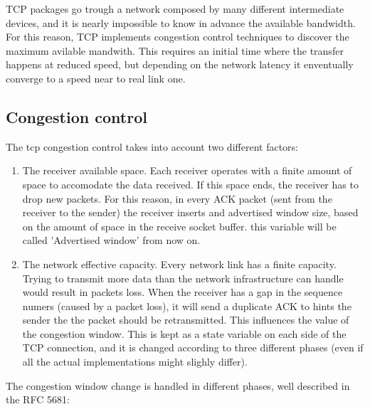 \documentclass[a4paper,10pt]{article}
\begin{document}
TCP packages go trough a network composed by many different intermediate devices, and it is nearly impossible to know in advance the available bandwidth. For this reason, TCP implements congestion control techniques to discover the maximum avilable mandwith. This requires an initial time where the transfer happens at reduced speed, but depending on the network latency it enventually converge to a speed near to real link one.

\subsection{Congestion control}
The tcp congestion control takes into account two different factors: 
\begin{enumerate}
   \item The receiver available space. Each receiver operates with a finite
      amount of space to accomodate the data received. If this space ends, the
      receiver has to drop new packets. For this reason, in every ACK packet (sent from the receiver to the sender)
      the receiver inserts and advertised window size, based on the amount of
      space in the receive socket buffer. this variable will be called
      'Advertised window' from now on. 
   \item The network effective capacity. Every network link has a finite
      capacity. Trying to transmit more data than the network infrastructure
      can handle would result in packets loss. When the receiver has a gap in
      the sequence numers (caused by a packet loss), it will send a duplicate
      ACK to hints the sender the the packet should be retransmitted. This
      influences the value of the congestion window.  This is kept as a state variable on each side
      of the TCP connection, and it is changed according to three different
      phases (even if all the actual implementations might slighly differ).
\end{enumerate}
The congestion window change is handled in different phases, well described in the RFC 5681\cite{RFC_5681}:
\end{document}
